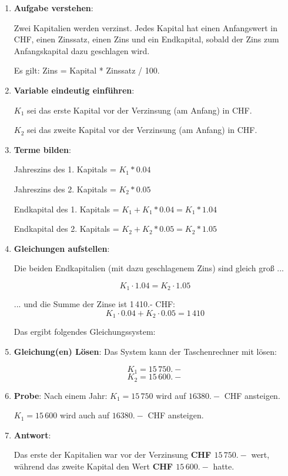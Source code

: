 



\usepackage{cancel}
\renewcommand{\metaHeaderLine}{Lösungsweg (Vorschlag)}
\renewcommand{\arbeitsblattTitel}{Marthaler Algebra S. 157 Aufg. 44.}

\arbeitsblattHeader{}

\begin{enumerate}
\item \textbf{Aufgabe verstehen}:

Zwei Kapitalien werden verzinst. Jedes Kapital hat
einen Anfangswert in CHF, einen Zinssatz, einen Zins und ein
Endkapital, sobald der Zins zum Anfangskapital dazu geschlagen wird.

Es gilt:  Zins = Kapital * Zinssatz / 100.

\item \textbf{Variable eindeutig einführen}:

$K_1$ sei das erste Kapital vor der Verzinsung (am Anfang) in CHF.

$K_2$ sei das zweite Kapital vor der Verzinsung (am Anfang) in CHF.

\item \textbf{Terme bilden}:

Jahreszins des 1. Kapitals = $K_1 * 0.04$

Jahreszins des 2. Kapitals = $K_2 * 0.05$

Endkapital des 1. Kapitals = $K_1 + K_1 * 0.04 = K_1 * 1.04$

Endkapital des 2. Kapitals = $K_2 + K_2 * 0.05 = K_2 * 1.05$

\item \textbf{Gleichungen aufstellen}:

Die beiden Endkapitalien (mit dazu geschlagenem Zins) sind gleich groß ...

$$K_1\cdot{} 1.04 = K_2 \cdot{} 1.05$$

... und die Summe der Zinse ist 1\,410.- CHF:
$$K_1\cdot{} 0.04 + K_2\cdot{} 0.05 = 1\,410$$

Das ergibt folgendes Gleichungssystem:


\item \textbf{Gleichung(en) Lösen}:
Das System kann der Taschenrechner mit  lösen:

$$K_1 = 15\,750.-$$
$$K_2 = 15\,600.-$$

\item \textbf{Probe}:
Nach einem Jahr: $K_1=15\,750$ wird auf $16380.-$ CHF ansteigen.

$K_1=15\,600$ wird auch auf $16380.-$ CHF ansteigen.

\item \textbf{Antwort}:

Das erste der Kapitalien war vor der Verzinsung \textbf{CHF $15\,750.-$}
wert, während das zweite Kapital den Wert \textbf{CHF $15\,600.-$} hatte.
\end{enumerate}


